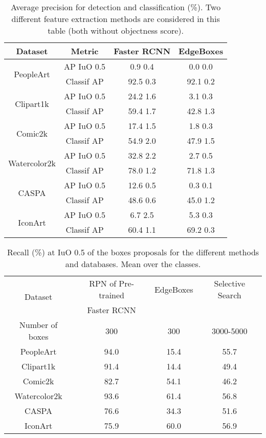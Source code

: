 \documentclass[preprint]{elsarticle}
\begin{document}
\begin{table*}[h]
\caption{Average precision for detection and classification (\%). Two different feature extraction methods are considered in this table (both without objectness score).}
\label{tab:EdgeBoxes}
\center
\begin{tabular}{|c|c|c|c|}
\hline
Dataset & Metric & Faster RCNN & EdgeBoxes \\ \hline \hline 
\multirow{2}{*}{PeopleArt} & AP IuO 0.5 & 0.9   0.4 & 0.0   0.0    \\ 
 & Classif AP & 92.5   0.3 & 92.1   0.2 \\
  \hline
  \multirow{2}{*}{Clipart1k} & AP IuO 0.5 &  24.2    1.6 & 3.1    0.3  \\
 & Classif AP & 59.4    1.7 & 42.8    1.3  \\
  \hline 
  \multirow{2}{*}{Comic2k} & AP IuO 0.5 &  17.4    1.5  & 1.8    0.3   \\
 & Classif AP & 54.9    2.0 & 47.9    1.5    \\ \hline
\multirow{2}{*}{Watercolor2k} & AP IuO 0.5 &32.8    2.2 & 2.7    0.5 \\
 & Classif AP & 78.0    1.2 & 71.8    1.3   \\
 \hline
 \multirow{2}{*}{CASPA} & AP IuO 0.5 & 12.6    0.5 & 0.3    0.1 \\
 & Classif AP &  48.6    0.6 &  45.0    1.2    \\
 \hline
\multirow{2}{*}{IconArt} &  AP IuO 0.5 & 6.7    2.5   & 5.3    0.3 \\  
 & Classif AP & 60.4    1.1 & 69.2    0.3 \\
 \hline
\end{tabular}
 \end{table*}










\begin{table*}[h]
\centering
\caption{Recall (\%) at IuO 0.5 of the boxes proposals for the different methods and databases. Mean over the classes.} \label{tab:Recall_boxes}
\begin{tabular}{|c|c|c|c|}
\hline
\multirow{2}{*}{Dataset} & RPN of Pre-trained  & EdgeBoxes &
Selective Search \\
& Faster RCNN \citep{ren_faster_2015} &\citep{zitnick_edge_2014}  & \citep{uijlings_selective_2013} \\ 
\hline
Number of boxes & 300 & 300 & 3000-5000 \\
\hline
PeopleArt & 94.0 & 15.4 & 55.7 \\
Clipart1k & 91.4 & 14.4 & 49.4 \\
Comic2k & 82.7 & 54.1 & 46.2 \\
Watercolor2k & 93.6 & 61.4 & 56.8 \\
CASPA & 76.6 & 34.3 & 51.6\\
IconArt & 75.9 & 60.0 & 56.9 \\
\hline
\end{tabular}
\end{table*}  
\end{document}
